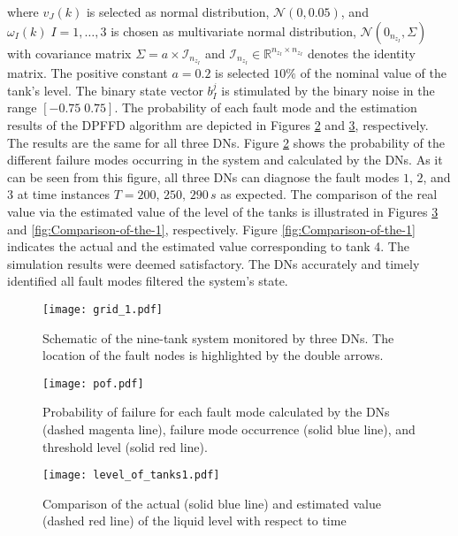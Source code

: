 \documentclass[10pt,twocolumn,twoside]{IEEEtran}
\begin{document}
where $v_{J}(k)$ is selected as normal distribution, $\mathcal{N}(0,0.05)$,
and $\omega_{I}(k)\; I=1,\ldots,3$ is chosen as multivariate normal
distribution, $\mathcal{N}(0_{n_{z_{I}}},\Sigma)$ with covariance
matrix $\Sigma=a\times\mathcal{I}_{n_{z_{I}}}$ and $\mathcal{I}_{n_{z_{I}}}\in\mathbb{R}^{n_{z_{I}}\times n_{z_{I}}}$
denotes the identity matrix. The positive constant $a=0.2$ is selected
$10\%$ of the nominal value of the tank\textquoteright{}s level. The binary state vector $b_I ^j$ is stimulated by the binary noise in the range $[-0.75\;0.75]$. The probability of each fault mode and the estimation results of the
DPFFD algorithm are depicted in Figures \ref{fig:probability-of-failure}
and \ref{fig:Comparison-of-the}, respectively. The results are the
same for all three DNs. Figure \ref{fig:probability-of-failure} shows
the probability of the different failure modes occurring  in the system
and calculated by the DNs. As it can be seen from this figure, all
three DNs can diagnose the fault modes $1$, $2$, and $3$ at time
instances $T=200,\,250,\,290\, s$ as expected. The comparison of
the real value via the estimated value of the level of the tanks is
illustrated in Figures \ref{fig:Comparison-of-the} and \ref{fig:Comparison-of-the-1}, respectively. Figure \ref{fig:Comparison-of-the-1} indicates the actual and the estimated value corresponding to tank 4. The simulation
results were deemed satisfactory. The DNs accurately and timely identified
all fault modes filtered the system's state. 

\begin{figure}
\centering
\texttt{[image: grid\_1.pdf]}
\caption{Schematic of the nine-tank system monitored by three DNs. The location of the fault nodes is highlighted by the double arrows. \label{fig:Schematic-of-the}}
\end{figure}


\begin{figure}
\begin{centering}
\texttt{[image: pof.pdf]}
\par\end{centering}

\caption{Probability of failure for each fault mode calculated by the DNs (dashed magenta line), failure mode occurrence (solid blue line), and threshold level (solid red line).\label{fig:probability-of-failure}}
\end{figure}

\begin{figure}
\centering\texttt{[image: level\_of\_tanks1.pdf]}\caption{Comparison of the actual (solid blue line) and estimated value (dashed red line) of the liquid level with respect to time \label{fig:Comparison-of-the}}
\end{figure}
\end{document}
